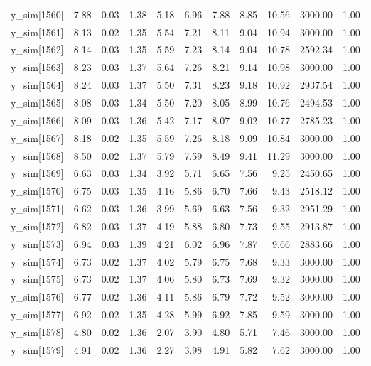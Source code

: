 \begin{table}[ht]
\begin{tabular}{rrrrrrrrrrr}
  y\_sim[1560] & 7.88 & 0.03 & 1.38 & 5.18 & 6.96 & 7.88 & 8.85 & 10.56 & 3000.00 & 1.00 \\ 
  y\_sim[1561] & 8.13 & 0.02 & 1.35 & 5.54 & 7.21 & 8.11 & 9.04 & 10.94 & 3000.00 & 1.00 \\ 
  y\_sim[1562] & 8.14 & 0.03 & 1.35 & 5.59 & 7.23 & 8.14 & 9.04 & 10.78 & 2592.34 & 1.00 \\ 
  y\_sim[1563] & 8.23 & 0.03 & 1.37 & 5.64 & 7.26 & 8.21 & 9.14 & 10.98 & 3000.00 & 1.00 \\ 
  y\_sim[1564] & 8.24 & 0.03 & 1.37 & 5.50 & 7.31 & 8.23 & 9.18 & 10.92 & 2937.54 & 1.00 \\ 
  y\_sim[1565] & 8.08 & 0.03 & 1.34 & 5.50 & 7.20 & 8.05 & 8.99 & 10.76 & 2494.53 & 1.00 \\ 
  y\_sim[1566] & 8.09 & 0.03 & 1.36 & 5.42 & 7.17 & 8.07 & 9.02 & 10.77 & 2785.23 & 1.00 \\ 
  y\_sim[1567] & 8.18 & 0.02 & 1.35 & 5.59 & 7.26 & 8.18 & 9.09 & 10.84 & 3000.00 & 1.00 \\ 
  y\_sim[1568] & 8.50 & 0.02 & 1.37 & 5.79 & 7.59 & 8.49 & 9.41 & 11.29 & 3000.00 & 1.00 \\ 
  y\_sim[1569] & 6.63 & 0.03 & 1.34 & 3.92 & 5.71 & 6.65 & 7.56 & 9.25 & 2450.65 & 1.00 \\ 
  y\_sim[1570] & 6.75 & 0.03 & 1.35 & 4.16 & 5.86 & 6.70 & 7.66 & 9.43 & 2518.12 & 1.00 \\ 
  y\_sim[1571] & 6.62 & 0.03 & 1.36 & 3.99 & 5.69 & 6.63 & 7.56 & 9.32 & 2951.29 & 1.00 \\ 
  y\_sim[1572] & 6.82 & 0.03 & 1.37 & 4.19 & 5.88 & 6.80 & 7.73 & 9.55 & 2913.87 & 1.00 \\ 
  y\_sim[1573] & 6.94 & 0.03 & 1.39 & 4.21 & 6.02 & 6.96 & 7.87 & 9.66 & 2883.66 & 1.00 \\ 
  y\_sim[1574] & 6.73 & 0.02 & 1.37 & 4.02 & 5.79 & 6.75 & 7.68 & 9.33 & 3000.00 & 1.00 \\ 
  y\_sim[1575] & 6.73 & 0.02 & 1.37 & 4.06 & 5.80 & 6.73 & 7.69 & 9.32 & 3000.00 & 1.00 \\ 
  y\_sim[1576] & 6.77 & 0.02 & 1.36 & 4.11 & 5.86 & 6.79 & 7.72 & 9.52 & 3000.00 & 1.00 \\ 
  y\_sim[1577] & 6.92 & 0.02 & 1.35 & 4.28 & 5.99 & 6.92 & 7.85 & 9.59 & 3000.00 & 1.00 \\ 
  y\_sim[1578] & 4.80 & 0.02 & 1.36 & 2.07 & 3.90 & 4.80 & 5.71 & 7.46 & 3000.00 & 1.00 \\ 
  y\_sim[1579] & 4.91 & 0.02 & 1.36 & 2.27 & 3.98 & 4.91 & 5.82 & 7.62 & 3000.00 & 1.00 \\ 

\end{tabular}
\end{table}
